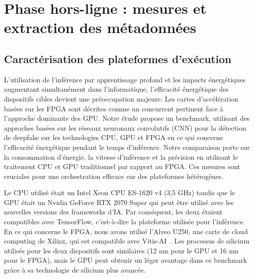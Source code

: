 \section{Phase hors-ligne : mesures et extraction des métadonnées}
\label{section:herofake-offline}

\subsection{Caractérisation des plateformes d'exécution}

\begin{table}[t]
\caption{Execution platform characterization}
\begin{center}
\end{center}
\label{table:herofake-platforms}
\end{table}

L'utilisation de l'inférence par apprentissage profond et les impacts énergétiques augmentant simultanément dans l'informatique, l'efficacité énergétique des dispositifs cibles devient une préoccupation majeure. Les cartes d'accélération basées sur les FPGA sont décrites comme un concurrent pertinent face à l'approche dominante des GPU. Notre étude propose un benchmark, utilisant des approches basées sur les réseaux neuronaux convolutifs (CNN) pour la détection de deepfake sur les technologies CPU, GPU et FPGA en ce qui concerne l'efficacité énergétique pendant le temps d'inférence. Notre comparaison porte sur la consommation d'énergie, la vitesse d'inférence et la précision en utilisant le traitement CPU et GPU traditionnel par rapport au FPGA. Ces mesures sont cruciales pour une orchestration efficace sur des plateformes hétérogènes.

Le CPU utilisé était un Intel Xeon CPU ES-1620 v4 (3,5 GHz) tandis que le GPU était un Nvidia GeForce RTX 2070 Super qui peut être utilisé avec les nouvelles versions des frameworks d'IA. Par conséquent, les deux étaient compatibles avec TensorFlow, c'est-à-dire la plateforme utilisée pour l'inférence. En ce qui concerne le FPGA, nous avons utilisé l'Alveo U250, une carte de cloud computing de Xilinx, qui est compatible avec Vitis-AI~\cite{vitis-ai}. Les processus de silicium utilisés pour les deux dispositifs sont similaires (12 nm pour le GPU et 16 nm pour le FPGA), mais le GPU peut obtenir un léger avantage dans ce benchmark grâce à sa technologie de silicium plus avancée.

